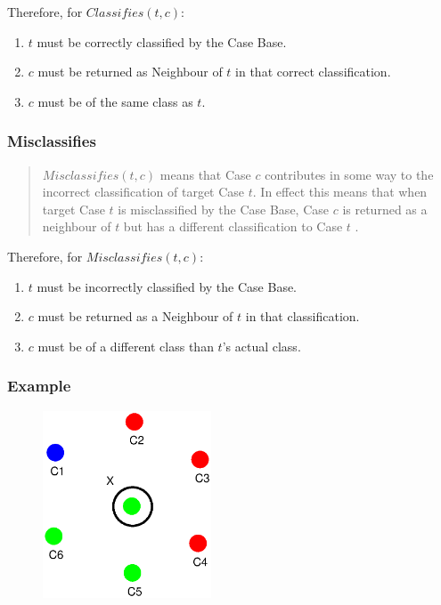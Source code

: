 \documentclass[a4paper,11pt]{report}
\begin{document}
Therefore, for $ Classifies(t, c) $:
\begin{enumerate}
	\item $t$ must be correctly classified by the Case Base.
	\item $c$ must be returned as Neighbour of $t$ in that correct classification.
	\item $c$ must be of the same class as $t$.
\end{enumerate}

\subsubsection{Misclassifies}

\begin{quote}
$ Misclassifies(t, c ) $ means that Case $c$ contributes in some way to the incorrect classification of target Case $t$. In effect this means that when target Case $t$ is misclassified by the Case Base, Case $c$ is returned as a neighbour of $t$ but has a different classification to Case $t$ \citep{Delany2009}.
\end{quote}


Therefore, for $ Misclassifies(t, c) $:
\begin{enumerate}
	\item $t$ must be incorrectly classified by the Case Base.
	\item $c$ must be returned as a Neighbour of $t$ in that classification.
	\item $c$ must be of a different class than $t$'s actual class.
\end{enumerate}

\subsubsection{Example}
\begin{figure}[h!] \centering
\includegraphics[width=5cm]{./Drawn/EqualDistanceMisclassifiesEg}
\end{figure}
\end{document}
